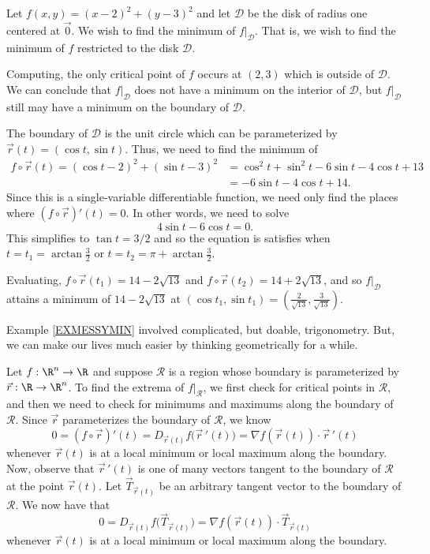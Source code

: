 \begin{example}
	\label{EXMESSYMIN}
	Let $f(x,y)=(x-2)^2+(y-3)^2$
	and let $\mathcal D$ be the disk of radius one centered at $\vec 0$.  We wish to find
	the minimum of $f\big|_{\mathcal D}$.  That is, we wish to find the minimum of $f$ restricted
	to the disk $\mathcal D$.

	Computing, the only critical point of $f$ occurs at $(2,3)$ which is outside of $\mathcal D$.
	We can conclude that $f\big|_{\mathcal D}$ does not have a minimum on the interior of $\mathcal D$,
	but $f\big|_{\mathcal D}$ still may have a minimum on the boundary of $\mathcal D$.

	The boundary of $\mathcal D$ is the unit circle which can be parameterized by $\vec r(t)=(\cos t,
	\sin t)$.  Thus, we need to find the minimum of 
	\begin{align*}
		f\circ \vec r(t) = (\cos t-2)^2+(\sin t-3)^2&=\cos^2t+\sin^2t-6\sin t-4\cos t+13\\
		&= -6\sin t-4\cos t+14.
	\end{align*}
	Since this is a single-variable differentiable function, we need only find the places
	where $(f\circ \vec r)'(t)=0$.  In other words, we need to solve
	\[
		4\sin t-6\cos t=0.
	\]
	This simplifies to $\tan t = 3/2$ and so the equation is satisfies when $t=t_1=\arctan \tfrac{3}{2}$
	or $t=t_2=\pi+\arctan \tfrac{3}{2}$.

	Evaluating, $f\circ \vec r(t_1)=14-2\sqrt{13}$ and $f\circ \vec r(t_2)=14+2\sqrt{13}$, and so 
	$f\big|_{\mathcal D}$ attains a minimum of $14-2\sqrt{13}$ at $(\cos t_1,\sin t_1)=(\tfrac{2}{\sqrt{13}},
	\tfrac{3}{\sqrt{13}})$.
\end{example}

Example \ref{EXMESSYMIN} involved complicated, but doable, trigonometry.  But, we can make our lives
much easier by thinking geometrically for a while.

Let $f:\R^n\to \R$ and suppose $\mathcal R$ is a region whose boundary is parameterized by
$\vec r:\R\to\R^n$.  To find the extrema of $f\big|_{\mathcal R}$, we first check for
critical points in $\mathcal R$, and then we need to check for minimums and maximums along
the boundary of $\mathcal R$.  Since $\vec r$ parameterizes the boundary of $\mathcal R$, we know
\[
	0=(f\circ \vec r)'(t) = D_{\vec r(t)}f\big(\vec r\,'(t)\big)=\nabla f(\vec r(t))\cdot \vec r\,'(t)
\]
whenever $\vec r(t)$ is at a local minimum or local maximum along the boundary.  Now, observe
that $\vec r\,'(t)$ is one of many vectors tangent to the boundary of $\mathcal R$
at the point $\vec r(t)$.  Let $\vec T_{\vec r(t)}$ be an arbitrary tangent vector
to the boundary of $\mathcal R$.  We now have that 
\[
	0= D_{\vec r(t)}f\big(\vec T_{\vec r(t)}\big)=\nabla f(\vec r(t))\cdot \vec T_{\vec r(t)}
\]
whenever $\vec r(t)$ is at a local minimum or local maximum along the boundary.

